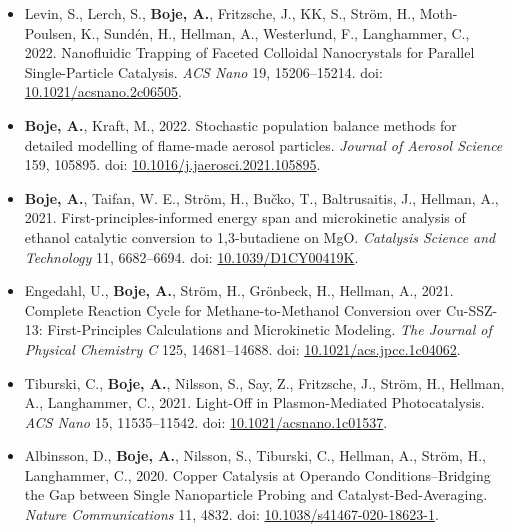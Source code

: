 \documentclass[11pt,a4paper,sans]{moderncv}   %
\def\addls{\vspace{2pt}}
\begin{document}
	\begin{itemize}
		
		\item{Levin, S., Lerch, S., \textbf{{Boje}, A.}, Fritzsche, J., KK, S., Str\"om, H., Moth-Poulsen, K., Sundén, H., Hellman, A., Westerlund, F., Langhammer, C., 2022. Nanofluidic Trapping of Faceted Colloidal Nanocrystals for Parallel Single-Particle Catalysis. \textit{ACS Nano} 19, 15206--15214. doi: \textcolor{royalblue}{\href{https://doi.org/10.1021/acsnano.2c06505}{10.1021/acsnano.2c06505}}.}
		
		\addls
		
		\item{\textbf{{Boje}, A.}, {Kraft}, M., 2022. Stochastic population balance methods for detailed modelling of flame-made aerosol particles. \textit{Journal of Aerosol Science} 159, 105895. doi: \textcolor{royalblue}{\href{https://doi.org/10.1016/j.jaerosci.2021.105895}{10.1016/j.jaerosci.2021.105895}}.}
		
		\addls
		
		\item{\textbf{Boje, A.}, Taifan, W. E., Str\"om, H., Bu\v{c}ko, T., Baltrusaitis, J., Hellman, A., 2021. First-principles-informed energy span and microkinetic analysis of ethanol catalytic conversion to 1,3-butadiene on MgO. \textit{Catalysis Science and Technology} 11, 6682--6694. doi: \textcolor{royalblue}{\href{https://doi.org/10.1039/D1CY00419K}{10.1039/D1CY00419K}}.}
		
		\addls
		
		\item{Engedahl, U., \textbf{Boje, A.}, Str\"om, H., Gr\"onbeck, H., Hellman, A., 2021. Complete Reaction Cycle for Methane-to-Methanol Conversion over Cu-SSZ-13: First-Principles Calculations and Microkinetic Modeling. \textit{The Journal of Physical Chemistry C} 125, 14681--14688. doi:  \textcolor{royalblue}{\href{https://doi.org/10.1021/acs.jpcc.1c04062}{10.1021/acs.jpcc.1c04062}}.}
		
		\addls
		
		\item{Tiburski, C., \textbf{Boje, A.}, Nilsson, S., Say, Z., Fritzsche, J., Str\"om, H., Hellman, A., Langhammer, C., 2021. Light-Off in Plasmon-Mediated Photocatalysis. \textit{ACS Nano} 15, 11535--11542. doi:  \textcolor{royalblue}{\href{https://pubs.acs.org/doi/10.1021/acsnano.1c01537}{10.1021/acsnano.1c01537}}.}
		
		\addls
		
		\item{Albinsson, D., \textbf{Boje, A.}, Nilsson, S., Tiburski, C., Hellman, A., Str\"om, H., Langhammer, C., 2020. Copper Catalysis at Operando Conditions–Bridging the Gap between Single Nanoparticle Probing and Catalyst-Bed-Averaging. \textit{Nature Communications} 11, 4832. doi:  \textcolor{royalblue}{\href{https://www.nature.com/articles/s41467-020-18623-1}{10.1038/s41467-020-18623-1}}.}
		

\end{itemize}
\end{document}
